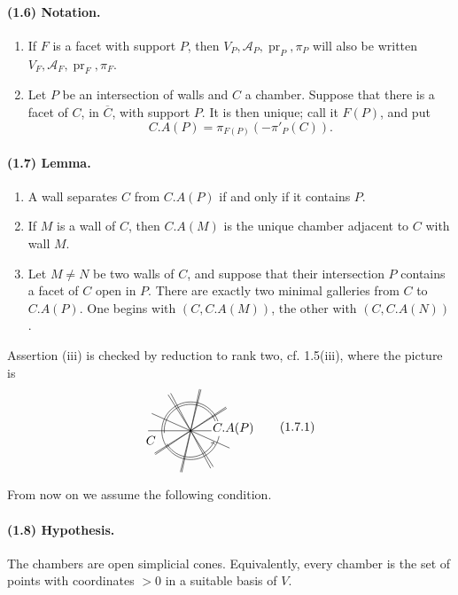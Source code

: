 \documentclass[10pt]{article}
\newcommand{\cl}[1]{\overline{#1}}
\newcommand{\mcA}{\mathcal A}
\begin{document}
\paragraph{(1.6) Notation.} \begin{enumerate}[label=(\roman*)]
\item If $F$ is a facet with support $P$, then $V_P,\mcA_P,\operatorname{pr}_P,\pi_P$ will also be written $V_F,\mcA_F,\operatorname{pr}_F,\pi_F$.
\item Let $P$ be an intersection of walls and $C$ a chamber. Suppose that there is a facet of $C$, in $\cl C$, with support $P$. It is then unique; call it $F(P)$, and put
\[
C.A(P)=\pi_{F(P)}(-\pi'_P(C)).
\]
\end{enumerate}

\paragraph{(1.7) Lemma.} \begin{enumerate}[label=(\roman*)]
\item A wall separates $C$ from $C.A(P)$ if and only if it contains $P$.
\item If $M$ is a wall of $C$, then $C.A(M)$ is the unique chamber adjacent to $C$ with wall $M$.
\item Let $M\ne N$ be two walls of $C$, and suppose that their intersection $P$ contains a facet of $C$ open in $P$. There are exactly two minimal galleries from $C$ to $C.A(P)$. One begins with $(C,C.A(M))$, the other with $(C,C.A(N))$.
\end{enumerate}
Assertion (iii) is checked by reduction to rank two, cf. 1.5(iii), where the picture is
\[
\begin{tikzpicture}[scale=0.78,baseline={(0,0)}]
\draw (0,0) circle (1.05);
\foreach \a in {0,32,76,118,156,214,258,302}
  {\draw ({1.55*cos(\a)},{1.55*sin(\a)})--({-1.55*cos(\a)},{-1.55*sin(\a)});}
\draw[->] (-0.96,-0.08) arc[start angle=185,end angle=15,radius=0.96];
\draw[->] (-0.86,-0.48) arc[start angle=210,end angle=335,radius=0.96];
\node[fill=white,inner sep=1pt] at (-1.45,-0.35) {$C$};
\node[fill=white,inner sep=1pt] at (1.55,0.08) {$C.A(P)$};
\end{tikzpicture}
\tag{1.7.1}
\]

From now on we assume the following condition.

\paragraph{(1.8) Hypothesis.} The chambers are open simplicial cones. Equivalently, every chamber is the set of points with coordinates $>0$ in a suitable basis of $V$.
\end{document}
